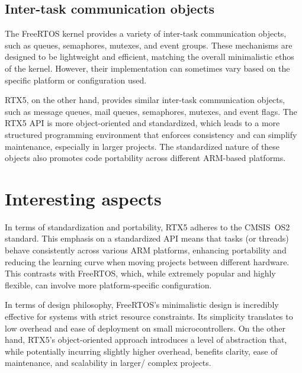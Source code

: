 \subsection*{Inter-task communication objects}

The FreeRTOS kernel provides a variety of inter-task communication objects, such as queues, semaphores, mutexes, and event groups.
These mechanisms are designed to be lightweight and efficient, matching the overall minimalistic ethos of the kernel.
However, their implementation can sometimes vary based on the specific platform or configuration used.

RTX5, on the other hand, provides similar inter-task communication objects, such as message queues, mail queues, semaphores, mutexes, and event flags.
The RTX5 API is more object-oriented and standardized, which leads to a more structured programming environment that enforces consistency and can simplify maintenance, especially in larger projects.
The standardized nature of these objects also promotes code portability across different ARM-based platforms.

\section*{Interesting aspects}

In terms of standardization and portability, RTX5 adheres to the CMSIS OS2 standard.
This emphasis on a standardized API means that tasks (or threads) behave consistently across various ARM platforms, enhancing portability and reducing the learning curve when moving projects between different hardware.
This contrasts with FreeRTOS, which, while extremely popular and highly flexible, can involve more platform-specific configuration.

In terms of design philosophy, FreeRTOS’s minimalistic design is incredibly effective for systems with strict resource constraints.
Its simplicity translates to low overhead and ease of deployment on small microcontrollers.
On the other hand, RTX5’s object-oriented approach introduces a level of abstraction that, while potentially incurring slightly higher overhead, benefits clarity, ease of maintenance, and scalability in larger/ complex projects.

